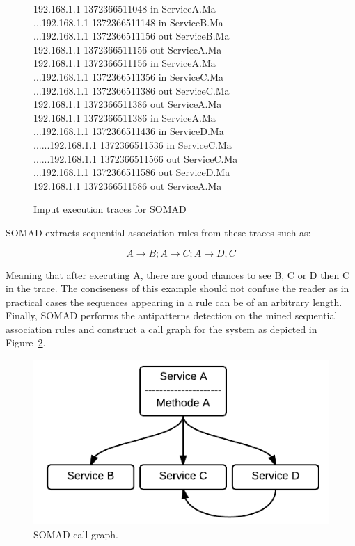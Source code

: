 \documentclass[lnbip]{svmultln}
\begin{document}
\begin{figure}
\scriptsize{
192.168.1.1 1372366511048 in ServiceA.Ma\\
...192.168.1.1 1372366511148 in ServiceB.Ma\\
...192.168.1.1 1372366511156 out ServiceB.Ma \\
192.168.1.1 1372366511156 out ServiceA.Ma \\
192.168.1.1 1372366511156 in ServiceA.Ma\\
...192.168.1.1 1372366511356 in ServiceC.Ma \\
...192.168.1.1 1372366511386 out ServiceC.Ma \\
192.168.1.1 1372366511386 out ServiceA.Ma  \\
192.168.1.1 1372366511386 in ServiceA.Ma \\
...192.168.1.1 1372366511436 in ServiceD.Ma \\
......192.168.1.1 1372366511536 in ServiceC.Ma \\
......192.168.1.1 1372366511566 out ServiceC.Ma\\
...192.168.1.1 1372366511586 out ServiceD.Ma \\
192.168.1.1 1372366511586 out ServiceA.Ma}
    
\caption{Imput execution traces for SOMAD \label{fig:traces}}
\end{figure}

SOMAD extracts sequential association rules from these traces such as:

\begin{equation}
A \rightarrow B; A \rightarrow C; A \rightarrow D, C
\end{equation}

Meaning that after executing A, there are good chances to see B, C or D then C in the trace. The conciseness of this example should not confuse the reader as in practical cases the sequences appearing in a rule can be of an arbitrary length. Finally, SOMAD performs the antipatterns detection on the mined sequential association rules and construct a call graph for the system as depicted in Figure~\ref{fig:flow}.

\begin{figure}
    \centering
	\includegraphics[scale=0.35]{flow.png}
 	\caption{SOMAD call graph.}
    \label{fig:flow}
\end{figure}
\end{document}
